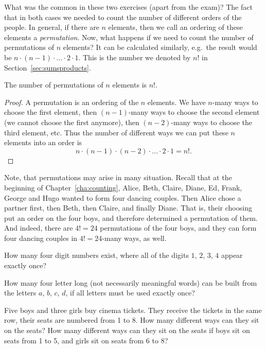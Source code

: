 What was the common in these two exercises (apart from the exam)? 
The fact that in both cases we needed to count the number of different orders of the people. 
In general, 
if there are $n$ elements, then we call an ordering of these elements a \emph{permutation}. 
Now, what happens if we need to count the number of permutations of $n$ elements? 
It can be calculated similarly, 
e.g.\ the result would be $n \cdot (n-1) \cdot \dots \cdot 2 \cdot 1$. 
This is the number we denoted by $n!$ in Section~\ref{sec:sumsproducts}.

\begin{theorem}\label{thm:perm}
The number of permutations of $n$ elements is $n!$. 
\end{theorem}

\begin{proof}
A permutation is an ordering of the $n$ elements. 
We have $n$-many ways to choose the first element, 
then $(n-1)$-many ways to choose the second element (we cannot choose the first anymore), 
then $(n-2)$-many ways to choose the third element, etc. 
Thus the number of different ways we can put these $n$ elements into an order is
\[
n \cdot (n-1) \cdot (n-2) \cdot \dots \cdot 2 \cdot 1 = n!. 
\]
\end{proof}

Note, that permutations may arise in many situation. 
Recall that at the beginning of Chapter~\ref{cha:counting}, 
Alice, Beth, Claire, Diane, Ed, Frank, George and Hugo wanted to form four dancing couples. 
Then Alice chose a partner first, then Beth, then Claire, and finally Diane. 
That is, their choosing put an order on the four boys, 
and therefore determined a permutation of them. 
And indeed, there are $4!=24$ permutations of the four boys, 
and they can form four dancing couples in $4!=24$-many ways, as well. 

\begin{exercise}\label{ex:perm1}
How many four digit numbers exist, 
where all of the digits $1$, $2$, $3$, $4$ appear exactly once? 
\end{exercise}

\begin{exercise}\label{ex:perm2}
How many four letter long (not necessarily meaningful words) can be built from the letters $a$, $b$, $c$, $d$, 
if all letters must be used exactly once? 
\end{exercise}

\begin{exercise}\label{ex:perm3}
Five boys and three girls buy cinema tickets. 
They receive the tickets in the same row, 
their seats are numbered from 1 to 8. 
How many different ways can they sit on the seats? 
How many different ways can they sit on the seats if boys sit on seats from 1 to 5, 
and girls sit on seats from 6 to 8? 
\end{exercise}



